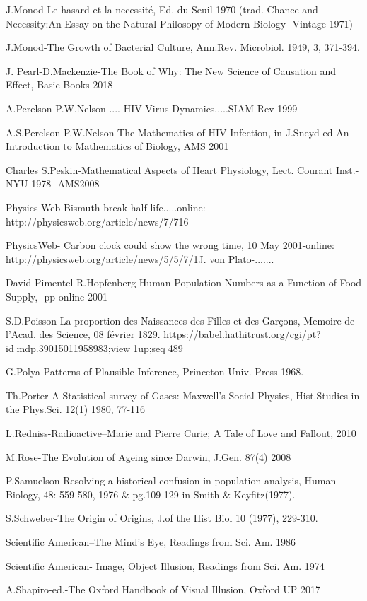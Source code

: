 J.Monod-Le hasard et la necessité, Ed. du Seuil 1970-(trad. Chance and Necessity:An Essay on the Natural Philosopy of Modern Biology- Vintage 1971)

J.Monod-The Growth of Bacterial Culture, Ann.Rev. Microbiol. 1949, 3, 371-394.

J. Pearl-D.Mackenzie-The Book of Why: The New Science of Causation and Effect, Basic Books 2018

A.Perelson-P.W.Nelson-.... HIV Virus Dynamics.....SIAM Rev 1999

A.S.Perelson-P.W.Nelson-The Mathematics of HIV Infection, in J.Sneyd-ed-An Introduction to Mathematics of Biology, AMS 2001

Charles S.Peskin-Mathematical Aspects of Heart Physiology, Lect. Courant Inst.-NYU 1978- AMS2008

Physics Web-Bismuth break half-life.....online: http://physicsweb.org/article/news/7/716

PhysicsWeb- Carbon clock could show the wrong time, 10 May 2001-online: http://physicsweb.org/article/news/5/5/7/1J. von Plato-.......

David Pimentel-R.Hopfenberg-Human Population Numbers as a Function of Food Supply, -pp online 2001

S.D.Poisson-La proportion des Naissances des Filles et des Garçons, Memoire de l’Acad. des Science, 08 février 1829. https://babel.hathitrust.org/cgi/pt?idmdp.39015011958983;view1up;seq489

G.Polya-Patterns of Plausible Inference, Princeton Univ. Press 1968.

Th.Porter-A Statistical survey of Gases: Maxwell’s Social Physics, Hist.Studies in the Phys.Sci. 12(1) 1980, 77-116

L.Redniss-Radioactive–Marie and Pierre Curie; A Tale of Love and Fallout, 2010

M.Rose-The Evolution of Ageing since Darwin, J.Gen. 87(4) 2008

P.Samuelson-Resolving a historical confusion in population analysis, Human Biology, 48: 559-580, 1976 \& pg.109-129 in Smith \& Keyfitz(1977).

S.Schweber-The Origin of Origins, J.of the Hist Biol 10 (1977), 229-310.

Scientific American–The Mind’s Eye, Readings from Sci. Am. 1986

Scientific American- Image, Object Illusion, Readings from Sci. Am. 1974

A.Shapiro-ed.-The Oxford Handbook of Visual Illusion, Oxford UP 2017

